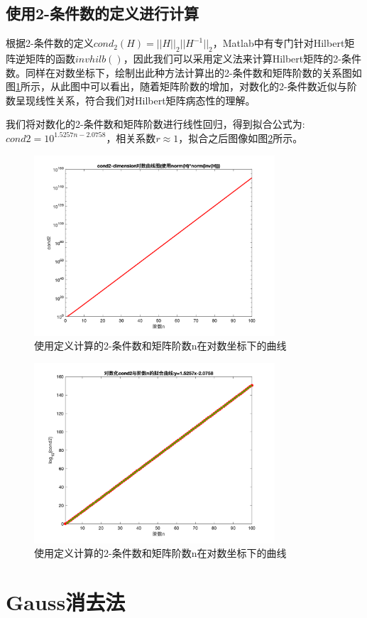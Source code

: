 \documentclass[a4paper]{article}
\begin{document}
\subsection{使用2-条件数的定义进行计算}
根据2-条件数的定义$cond_2(H)=||H||_2||H^{-1}||_2$，Matlab中有专门针对Hilbert矩阵逆矩阵的函数$invhilb()$，因此我们可以采用定义法来计算Hilbert矩阵的2-条件数。同样在对数坐标下，绘制出此种方法计算出的2-条件数和矩阵阶数的关系图如图\ref{fig:2}所示，从此图中可以看出，随着矩阵阶数的增加，对数化的2-条件数近似与阶数呈现线性关系，符合我们对Hilbert矩阵病态性的理解。

我们将对数化的2-条件数和矩阵阶数进行线性回归，得到拟合公式为: $cond2=10^{1.5257n-2.0758}$，相关系数$r\approx 1$，拟合之后图像如图\ref{fig:3}所示。

\begin{figure}[!h]
	\centering
	\includegraphics[width=0.8\textwidth]{../code/result/alogcond2}
	\caption{\label{fig:2}使用定义计算的2-条件数和矩阵阶数n在对数坐标下的曲线}
\end{figure}

\begin{figure}[!h]
	\centering
	\includegraphics[width=0.8\textwidth]{../code/result/cond2fit}
	\caption{\label{fig:3}使用定义计算的2-条件数和矩阵阶数n在对数坐标下的曲线}
\end{figure}

\section{Gauss消去法}
\end{document}
